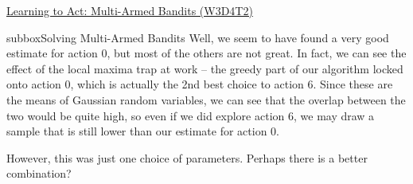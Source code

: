 \begin{textbox}{\href{https://compneuro.neuromatch.io/tutorials/W3D4_ReinforcementLearning/student/W3D4_Tutorial2.html}{Learning to Act: Multi-Armed Bandits (W3D4T2)} }
\begin{subbox}{subbox}{Solving Multi-Armed Bandits}
Well, we seem to have found a very good estimate for action 0, but most of the others are not great. In fact, we can see the effect of the local maxima trap at work -- the greedy part of our algorithm locked onto action 0, which is actually the 2nd best choice to action 6. Since these are the means of Gaussian random variables, we can see that the overlap between the two would be quite high, so even if we did explore action 6, we may draw a sample that is still lower than our estimate for action 0.

However, this was just one choice of parameters. Perhaps there is a better combination?

\end{subbox}
\end{textbox}
